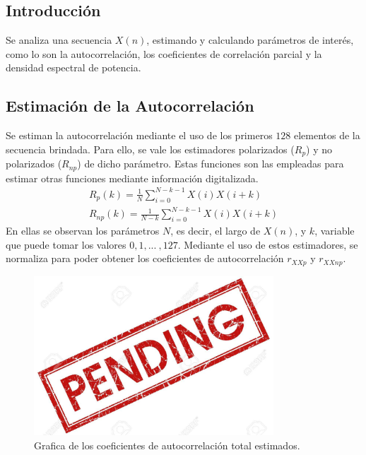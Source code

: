 







\tableofcontents
\newpage



\subsection{Introducción}

Se analiza una secuencia $X(n)$, estimando y calculando parámetros de interés, como lo son la autocorrelación, los coeficientes de correlación parcial y la densidad espectral de potencia.

\subsection{Estimación de la Autocorrelación} 

Se estiman la autocorrelación mediante el uso de los primeros $128$ elementos de la secuencia brindada. Para ello, se vale los estimadores polarizados ($R_{p}$) y no polarizados ($R_{np}$) de dicho parámetro. Estas funciones son las empleadas para estimar otras funciones mediante información digitalizada.
\begin{equation}
\begin{gathered}
	R_{p}(k) = \frac{1}{N} \sum_{i=0}^{N-k-1} X(i)X(i+k)	\\
	R_{np}(k) = \frac{1}{N-k} \sum_{i=0}^{N-k-1} X(i)X(i+k)
\end{gathered}
\end{equation}
En ellas se observan los parámetros $N$, es decir, el largo de $X(n)$, y $k$, variable que puede tomar los valores $0, 1, ... \ , 127$. Mediante el uso de estos estimadores, se normaliza para poder obtener los coeficientes de autocorrelación $r_{XXp}$ y $r_{XXnp}$. 

\begin{figure}[H]
\centering
	\includegraphics[width=0.8\textwidth, trim = {0 0 0 0},clip]{./Imagenes/pend.jpg}
	\caption{Grafica de los coeficientes de autocorrelación total estimados.}
	\label{fig:rxx}
\end{figure}

